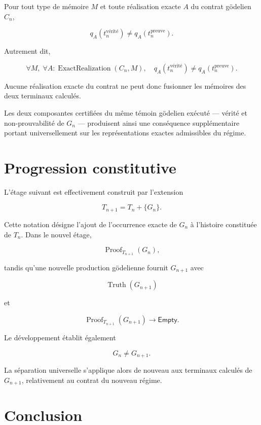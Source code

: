 \documentclass[11pt,a4paper]{article}
\newcommand{\Truth}{\operatorname{Truth}}
\newcommand{\Proof}{\operatorname{Proof}}
\newcommand{\ExactRealization}{\operatorname{ExactRealization}}
\newcommand{\Empty}{\mathsf{Empty}}
\begin{document}
Pour tout type de mémoire $M$ et toute réalisation exacte $A$ du contrat
gödelien $C_n$,

\[
  \boxed{
    q_A\!\left(t^{\mathrm{vérité}}_n\right)
    \neq
    q_A\!\left(t^{\mathrm{preuve}}_n\right)
  }.
\]

Autrement dit,

\[
  \boxed{
    \forall M,\;
    \forall A : \ExactRealization(C_n,M),\quad
    q_A\!\left(t^{\mathrm{vérité}}_n\right)
    \neq
    q_A\!\left(t^{\mathrm{preuve}}_n\right)
  }.
\]

Aucune réalisation exacte du contrat ne peut donc fusionner les mémoires des
deux terminaux calculés.

Les deux composantes certifiées du même témoin gödelien exécuté --- vérité et
non-prouvabilité de $G_n$ --- produisent ainsi une conséquence supplémentaire
portant universellement sur les représentations exactes admissibles du régime.

\section{Progression constitutive}

L'étage suivant est effectivement construit par l'extension

\[
  T_{n+1} = T_n + \{G_n\}.
\]

Cette notation désigne l'ajout de l'occurrence exacte de $G_n$ à l'histoire
constituée de $T_n$. Dans le nouvel étage,

\[
  \Proof_{T_{n+1}}(G_n),
\]

tandis qu'une nouvelle production gödelienne fournit $G_{n+1}$ avec

\[
  \Truth(G_{n+1})
\]

et

\[
  \Proof_{T_{n+1}}(G_{n+1}) \longrightarrow \Empty.
\]

Le développement établit également

\[
  G_n \neq G_{n+1}.
\]

La séparation universelle s'applique alors de nouveau aux terminaux calculés
de $G_{n+1}$, relativement au contrat du nouveau régime.

\section{Conclusion}

\begin{center}
\end{center}
\end{document}
